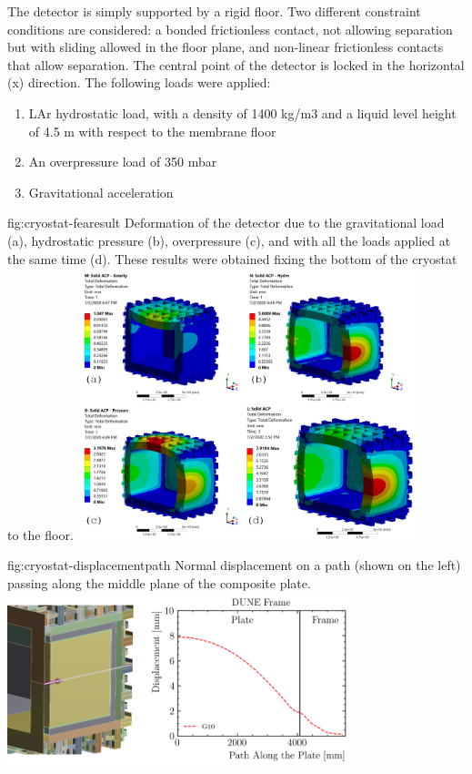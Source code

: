 The detector is simply supported by a rigid floor. Two different constraint conditions are considered: a bonded frictionless contact, not allowing separation but with sliding allowed in the floor plane, and non-linear frictionless contacts that allow separation. The central point of the detector is locked in the horizontal (x) direction. The following loads were applied:

\begin{enumerate}  
\item LAr hydrostatic load, with a density of 1400 kg/m3 and a liquid level height of 4.5 m with respect to the membrane floor
\item An overpressure load of 350 mbar
\item Gravitational acceleration
\end{enumerate}

\begin{dunefigure}[FE results]{fig:cryostat-fearesult}
{Deformation of the detector due to the gravitational load (a), hydrostatic pressure (b), overpressure (c), and with all the loads applied at the same time (d). These results were obtained fixing the bottom of the cryostat to the floor.}
\includegraphics[width=0.75\textwidth]{graphics/cryostat/cryostat-fearesult.png}
\end{dunefigure}

\begin{dunefigure}{fig:cryostat-displacementpath}
{Normal displacement on a path (shown on the left) passing along the middle plane of the composite plate.}
\includegraphics[width=0.75\textwidth]{graphics/cryostat/cryostat-displacementpath.png}
\end{dunefigure}

